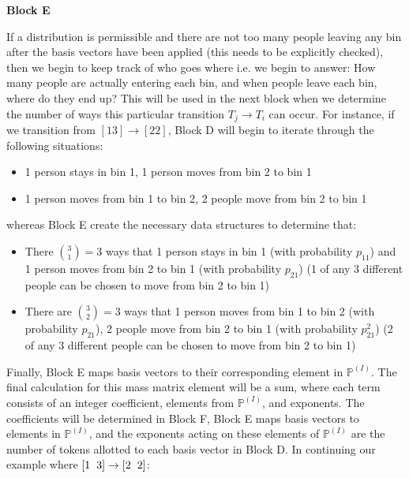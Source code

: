 \documentclass{article}
\begin{document}
\textbf{Block E}

If a distribution is permissible and there are not too many people leaving any bin after the basis vectors have been applied (this needs to be explicitly checked), then we begin to keep track of who goes where i.e. we begin to answer: How many people are actually entering each bin, and when people leave each bin, where do they end up? This will be used in the next block when we determine the number of ways this particular transition $T_j \rightarrow T_i$ can occur. For instance, if we transition from $[1 3] \rightarrow [2 2]$, Block D will begin to iterate through the following situations:

\begin{itemize}
    \item 1 person stays in bin 1, 1 person moves from bin 2 to bin 1
    \item 1 person moves from bin 1 to bin 2, 2 people move from bin 2 to bin 1
\end{itemize}

whereas Block E create the necessary data structures to determine that:

\begin{itemize}
    \item There ${3 \choose 1} = 3$ ways that 1 person stays in bin 1 (with probability $p_{11}$) and 1 person moves from bin 2 to bin 1 (with probability $p_{21}$) (1 of any 3 different people can be chosen to move from bin 2 to bin 1)
    \item There are ${3 \choose 2} = 3$ ways that 1 person moves from bin 1 to bin 2 (with probability $p_{21}$), 2 people move from bin 2 to bin 1 (with probability $p_{21}^2$) (2 of any 3 different people can be chosen to move from bin 2 to bin 1)
\end{itemize}

Finally, Block E maps basis vectors to their corresponding element in $\mathbb{P}^{(I)}$. The final calculation for this mass matrix element will be a sum, where each term consists of an integer coefficient, elements from $\mathbb{P}^{(I)}$, and exponents. The coefficients will be determined in Block F, Block E maps basis vectors to elements in $\mathbb{P}^{(I)}$, and the exponents acting on these elements of $\mathbb{P}^{(I)}$ are the number of tokens allotted to each basis vector in Block D. In continuing our example where $[1 \hspace{2mm} 3] \rightarrow [2 \hspace{2mm} 2]$:
\end{document}
